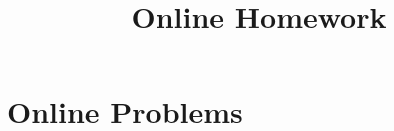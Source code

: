 \documentclass{ximera}
\title{Online Homework}
\begin{document}
\begin{abstract}
\end{abstract}
\maketitle

\section{Online Problems}









\end{document}
